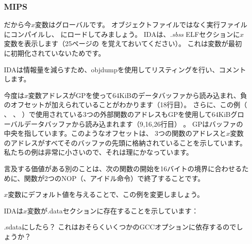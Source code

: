 \subsubsection{MIPS}


だから今$x$変数はグローバルです。 
オブジェクトファイルではなく実行ファイルにコンパイルし、 \IDA にロードしてみましょう。 
IDAは、\emph{.sbss} ELFセクションに$x$変数を表示します（25ページの を覚えておいてください）。
これは変数が最初に初期化されていないためです。



IDAは情報量を減らすため、objdumpを使用してリスティングを行い、コメントします。



今度は$x$変数アドレスがGPを使って64KiBのデータバッファから読み込まれ、負のオフセットが加えられていることがわかります（18行目）。 
さらに、この例（ \puts 、 \scanf 、 \printf ）で使用されている3つの外部関数のアドレスもGPを使用して64KiBグローバルデータバッファから読み込まれます（9,16,26行目） 。 
GPはバッファの中央を指しています。このようなオフセットは、
3つの関数のアドレスと$x$変数のアドレスがすべてそのバッファの先頭に格納されていることを示しています。 
私たちの例は非常に小さいので、それは理にかなっています。


言及する価値がある別のことは、次の関数の開始を16バイトの境界に合わせるために、関数が2つの\ac{NOP}（、アイドル命令）で終了することです。


$x$変数にデフォルト値を与えることで、この例を変更しましょう。



IDAは$x$変数が.dataセクションに存在することを示しています：



.sdataにしたら？ これはおそらくいくつかのGCCオプションに依存するのでしょうか？

